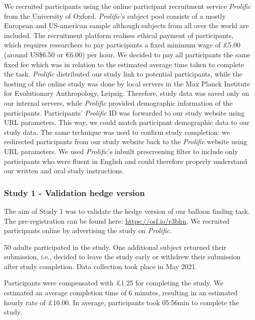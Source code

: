 \documentclass[
  english,
  man,floatsintext]{apa6}
\begin{document}
We recruited participants using the online participant recruitment service \emph{Prolific} from the University of Oxford. \emph{Prolific}'s subject pool consists of a mostly European and US-american sample although subjects from all over the world are included. The recruitment platform realises ethical payment of participants, which requires researchers to pay participants a fixed minimum wage of £5.00 (around US\$6.50 or €6.00) per hour. We decided to pay all participants the same fixed fee which was in relation to the estimated average time taken to complete the task.
\emph{Prolific} distributed our study link to potential participants, while the hosting of the online study was done by local servers in the Max Planck Institute for Evolutionary Anthropology, Leipzig. Therefore, study data was saved only on our internal servers, while \emph{Prolific} provided demographic information of the participants.
Participants' \emph{Prolific} ID was forwarded to our study website using URL parameters. This way, we could match participant demographic data to our study data. The same technique was used to confirm study completion: we redirected participants from our study website back to the \emph{Prolific} website using URL parameters.
We used \emph{Prolific}'s inbuilt prescreening filter to include only participants who were fluent in English and could therefore properly understand our written and oral study instructions.

\hypertarget{study-1---validation-hedge-version}{%
\subsubsection{Study 1 - Validation hedge version}\label{study-1---validation-hedge-version}}

The aim of Study 1 was to validate the hedge version of our balloon finding task. The pre-registration can be found here: \url{https://osf.io/r3bhn}. We recruited participants online by advertising the study on \emph{Prolific}.

50 adults participated in the study. One additional subject returned their submission, i.e., decided to leave the study early or withdrew their submission after study completion. Data collection took place in May 2021.

Participants were compensated with £1.25 for completing the study. We estimated an average completion time of 6 minutes, resulting in an estimated hourly rate of £10.00. In average, participants took 05:56min to complete the study.
\end{document}
